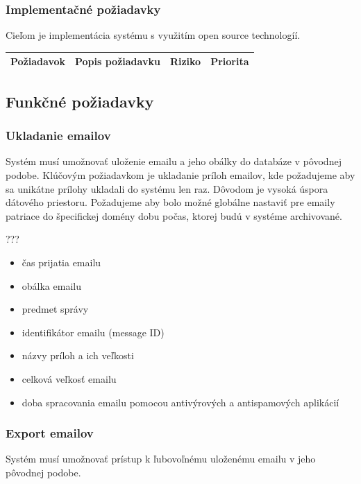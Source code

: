 \documentclass[11pt,twoside,a4paper]{book}
\begin{document}
\subsubsection{Implementačné požiadavky}
Cieľom je implementácia systému s využitím open source technologíí. 

\begin{table}
    \begin{tabular}{|l|l|l|l|}
        \hline
        Požiadavok & Popis požiadavku & Riziko & Priorita \\  \hline
    \end{tabular}
\end{table}

\subsection{Funkčné požiadavky}

\subsubsection{Ukladanie emailov}
Systém musí umožnovať uloženie emailu a jeho obálky do databáze v pôvodnej podobe. Klúčovým požiadavkom je ukladanie príloh emailov, kde požadujeme aby sa unikátne prílohy ukladali do systému len raz. Dôvodom je vysoká úspora dátového priestoru. Požadujeme aby bolo možné globálne nastaviť pre emaily patriace do špecifickej domény dobu počas, ktorej budú v systéme archivované.

???
\begin{itemize}
 \item
  čas prijatia emailu
 \item
  obálka emailu
 \item
  predmet správy
 \item
  identifikátor emailu (message ID)
 \item
  názvy príloh a ich veľkosti
 \item
  celková veľkosť emailu
 \item
  doba spracovania emailu pomocou antivýrových a antispamových aplikácií
\end{itemize}

\subsubsection{Export emailov}
Systém musí umožnovať prístup k ľubovoľnému uloženému emailu v jeho pôvodnej podobe.
\end{document}
